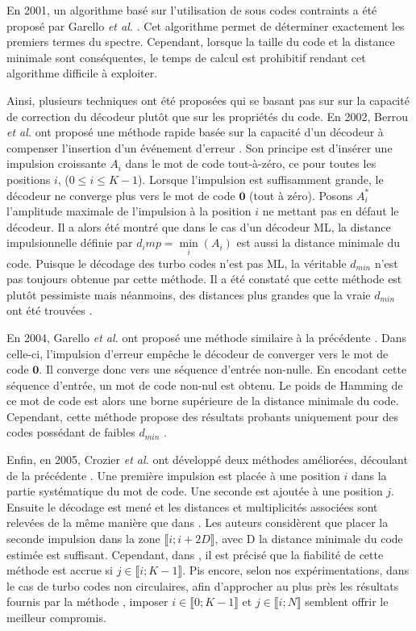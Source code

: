 En 2001, un algorithme basé sur l'utilisation de sous codes contraints a été proposé par Garello \textit{et al.} \cite{garellodfree}. 
Cet algorithme permet de déterminer exactement les premiers termes du spectre. Cependant, lorsque la taille du code et la 
distance minimale sont conséquentes, le temps de calcul est prohibitif rendant cet algorithme difficile à exploiter.
	
Ainsi, plusieurs techniques ont été proposées qui se basant pas sur sur la capacité de correction du décodeur plutôt que 
sur les propriétés du code. En 2002, Berrou \textit{et al.} ont proposé une méthode rapide basée sur la capacité d'un 
décodeur à compenser l'insertion d'un événement d'erreur \cite{eim}. Son principe est d'insérer une impulsion croissante 
$A_i$ dans le mot de code tout-à-zéro, ce pour toutes les positions $i$, ($0\le i \le K-1$). Lorsque l'impulsion est 
suffisamment grande, le décodeur ne converge plus vers le mot de code $\mathbf{0}$ (tout à zéro). Posons $A_i^*$ l'amplitude 
maximale de l’impulsion à la position $i$ ne mettant pas en défaut le décodeur. Il a alors été montré que dans le cas 
d'un décodeur ML, la distance impulsionnelle définie par $d_imp = \min\limits_i (A_i)$ est aussi la distance minimale 
du code. Puisque le décodage des turbo codes n'est pas ML, la véritable $d_{min}$ n'est pas toujours obtenue par cette 
méthode. Il a été constaté que cette méthode est plutôt pessimiste mais néanmoins, des distances plus grandes que la 
vraie $d_{min}$ ont été trouvées \cite{yocComparisonMethods}.
	
En 2004, Garello \textit{et al.} ont proposé une méthode similaire à la précédente \cite{garelloAllZero}. Dans celle-ci, 
l'impulsion d'erreur empêche le décodeur de converger vers le mot de code $\mathbf{0}$. Il converge donc vers une séquence 
d'entrée non-nulle. En encodant cette séquence d'entrée, un mot de code non-nul est obtenu. Le poids de Hamming de ce mot 
de code est alors une borne supérieure de la distance minimale du code. Cependant, cette méthode propose des résultats 
probants uniquement pour des codes possédant de faibles $d_{min}$ \cite{yocComparisonMethods}.
	
Enfin, en 2005, Crozier \textit{et al.} ont développé deux méthodes améliorées, découlant de la précédente \cite{crozierDIM}. 
Une première impulsion est placée à une position $i$ dans la partie systématique du mot de code. Une seconde est ajoutée 
à une position $j$. Ensuite le décodage est mené et les distances et multiplicités associées sont relevées de la même 
manière que dans \cite{garelloAllZero}. Les auteurs considèrent que placer la seconde impulsion dans la zone $\llbracket i; i+2D\rrbracket$, 
avec D la distance minimale du code estimée est suffisant. Cependant, dans \cite{yocComparisonMethods}, il est précisé 
que la fiabilité de cette méthode est accrue si $j \in \llbracket i; K-1\rrbracket$. Pis encore, selon nos expérimentations, 
dans le cas de turbo codes non circulaires, afin d’approcher au plus près les résultats fournis par la méthode \cite{garellodfree}, 
imposer $i \in \llbracket 0; K-1\rrbracket$ et $j \in \llbracket i; N\rrbracket$ semblent offrir le meilleur compromis.
	
